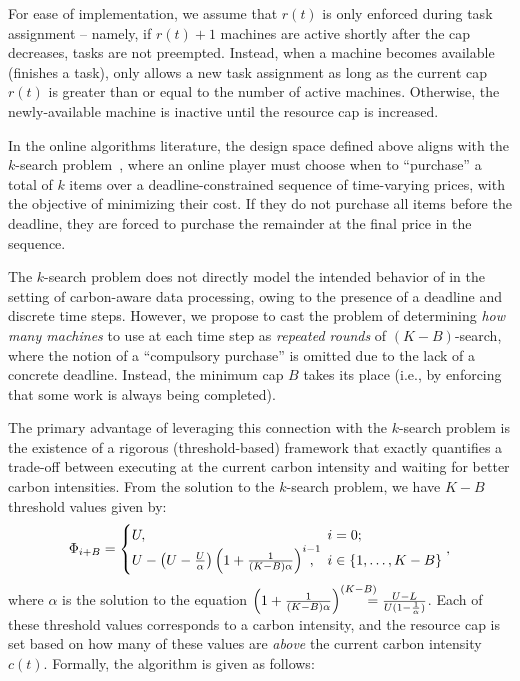 For ease of implementation, we assume that $r(t)$ is only enforced during task assignment -- namely, if $r(t)+1$ machines are active shortly after the cap decreases, tasks are not preempted.  Instead, when a machine becomes available (finishes a task), \CAP only allows a new task assignment as long as the current cap $r(t)$ is greater than or equal to the number of active machines.  Otherwise, the newly-available machine is inactive until the resource cap is increased.

In the online algorithms literature, the design space defined above aligns with the $k$-search problem~\cite{Lorenz:08}, where an online player must choose when to ``purchase'' a total of $k$ items over a deadline-constrained sequence of time-varying prices, with the objective of minimizing their cost.  If they do not purchase all items before the deadline, they are %
forced to purchase the remainder at the final price in the sequence.

The $k$-search problem does not directly model the intended behavior of \CAP in the setting of carbon-aware data processing, owing to the presence of a deadline and discrete time steps.
However, we propose to cast the problem of determining \textit{how many machines} to use at each time step as \textit{repeated rounds} of $(K-B)$-search, where the notion of a ``compulsory purchase'' is omitted due to the lack of a concrete deadline.  Instead, the minimum cap $B$ takes its place (i.e., by enforcing that some work is always being completed).

The primary advantage of leveraging this connection with the $k$-search problem is the existence of a rigorous (threshold-based) framework that exactly quantifies a trade-off between executing at the current carbon intensity and waiting for better carbon intensities.  From the solution to the $k$-search problem, we have $K-B$ threshold values given by:
\[
\Phi_{i+B} = \begin{cases}
    U , & i=0;\\
    U - \left(U - \frac{U}{\alpha} \right) \left( 1 + \frac{1}{\left(K-B\right)\alpha} \right)^{i-1} \kern-1em, & i \in \{1, \dots, K-B\}
\end{cases},
\]
where $\alpha$ is the solution to the equation $\left( 1 + \frac{1}{\left(K-B\right)\alpha} \right)^{\left(K-B\right)} \kern-1em = \frac{U-L}{U(1 - \frac{1}{\alpha})}$.  Each of these threshold values corresponds to a carbon intensity, and the resource cap is set based on how many of these values are \textit{above} the current carbon intensity $c(t)$.  Formally, the \CAP algorithm is given as follows:

